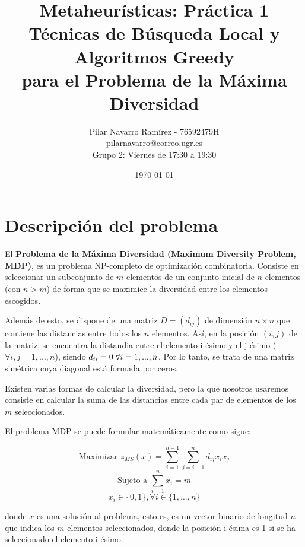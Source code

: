 \documentclass[11pt,a4paper]{article}
\title{\textbf{\huge Metaheurísticas: Práctica 1 }
	\\\medskip \Large Técnicas de Búsqueda Local y Algoritmos Greedy\\ para el Problema de la Máxima Diversidad \\\medskip}
\author{Pilar Navarro Ramírez - 76592479H \\ pilarnavarro@correo.ugr.es \\ Grupo 2: Viernes de 17:30 a 19:30}
\date{ \today }
\begin{document}
	
	
	\maketitle 
	\newpage
	\tableofcontents
	\newpage
	
	
	\section{Descripción del problema}
	
	
	El \textbf{Problema de la Máxima Diversidad (Maximum Diversity Problem, MDP)}, es un problema NP-completo de optimización combinatoria. 
	Consiste en seleccionar un subconjunto de $m$ elementos de un conjunto inicial de $n$ elementos (con $n>m$) de forma que se maximice la diversidad entre los elementos escogidos.
	
	Además de esto, se dispone de una matriz $D=(d_{ij})$ de dimensión $n\times n$ que contiene las distancias entre todos los $ n $ elementos. Así, en la posición $(i,j)$ de la matriz, se encuentra la distandia entre el elemento i-ésimo y el j-ésimo ($\forall i,j=1,...,n$), siendo $d_{ii}=0\hspace{1mm}\forall i=1,...,n$. Por lo tanto, se trata de una matriz simétrica cuya diagonal está formada por ceros. 
	
	Existen varias formas de calcular la diversidad, pero la que nosotros usaremos consiste en calcular la suma de las distancias entre cada par de elementos de los $m$ seleccionados. 
	
	 El problema MDP se puede formular matemáticamente como sigue:
	
	$$ \text{Maximizar } z_{MS}(x) = \sum_{i=1}^{n-1} \sum_{j=i+1}^{n} d_{ij} x_i x_j $$
	$$ \text{Sujeto a } \sum_{i=1}^{n} x_i = m $$
	$$ x_i \in \{0,1\}, \forall i \in \{1,\dotsc,n\} $$
	
	donde $x$ es una solución al problema, esto es, es un vector binario de longitud $n$ que indica los $m$ elementos seleccionados, donde la posición i-ésima es 1 si se ha seleccionado el elemento i-ésimo.
	
	\newpage

%	
%	
	
\end{document}
